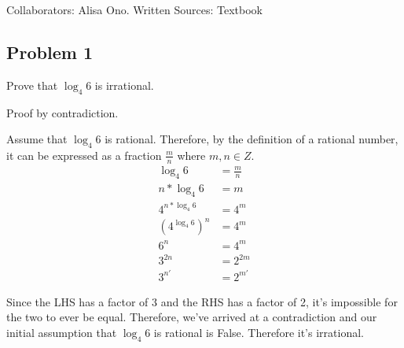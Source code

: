 \documentclass[12pt]{article}
\begin{document}
\setlength{\parindent}{0pt}\par{Collaborators: Alisa Ono. Written Sources: Textbook}
\subsection*{Problem 1}
\par{Prove that $\log_4 6$ is irrational.}
\newline
\par{Proof by contradiction.}
\par{Assume that $\log_4 6$ is rational. Therefore, by the definition of a rational number, it can be expressed as a fraction $\frac{m}{n}$ where $m, n \in Z$.}
\begin{align*}
\log_4 6 &= \frac{m}{n} \\
n * \log_4 6 &= m \\
4^{n * \log_4 6} &= 4^m \\
(4^{\log_4 6})^n &= 4^m \\
6^n &= 4^m \\
3^{2n} &= 2^{2m} \\
3^{n'} &= 2^{m'}
\end{align*}
\par{Since the LHS has a factor of 3 and the RHS has a factor of 2, it's impossible for the two to ever be equal. Therefore, we've arrived at a contradiction and our initial assumption that $\log_4 6$ is rational is False. Therefore it's irrational.}
\end{document}
